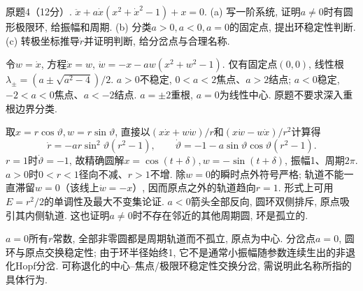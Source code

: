 \begin{exercise}
原题4（12分）. $\ddot x+a\dot x(x^2+\dot x^2-1)+x=0$. (a) 写一阶系统, 证明$a\ne0$时有圆形极限环, 给振幅和周期. (b) 分类$a>0,a<0,a=0$的固定点, 提出环稳定性判断. (c) 转极坐标推导$\dot r$并证明判断, 给分岔点与合理名称.
\end{exercise}
\begin{solution}
令$w=\dot x$, 方程$\dot x=w$, $\dot w=-x-aw(x^2+w^2-1)$. 仅有固定点$(0,0)$, 线性根$\lambda_\pm=(a\pm\sqrt{a^2-4})/2$. $a>0$不稳定, $0<a<2$焦点、$a>2$结点; $a<0$稳定, $-2<a<0$焦点、$a<-2$结点. $a=\pm2$重根, $a=0$为线性中心. 原题不要求深入重根边界分类.

取$x=r\cos\vartheta,w=r\sin\vartheta$, 直接以$(x\dot x+w\dot w)/r$和$(x\dot w-w\dot x)/r^2$计算得
\[
\dot r=-ar\sin^2\vartheta(r^2-1),\qquad
\dot\vartheta=-1-a\sin\vartheta\cos\vartheta(r^2-1).
\]
$r=1$时$\dot\vartheta=-1$, 故精确圆解$x=\cos(t+\delta),w=-\sin(t+\delta)$, 振幅1、周期$2\pi$. $a>0$时$0<r<1$径向不减、$r>1$不增. 除$w=0$的瞬时点外符号严格; 轨道不能一直滞留$w=0$（该线上$\dot w=-x$）, 因而原点之外的轨道趋向$r=1$. 形式上可用$E=r^2/2$的单调性及最大不变集论证. $a<0$箭头全部反向, 圆环双侧排斥, 原点吸引其内侧轨道. 这也证明$a\ne0$时不存在邻近的其他周期圆, 环是孤立的.

$a=0$所有$r$常数, 全部非零圆都是周期轨道而不孤立, 原点为中心. 分岔点$a=0$, 圆环与原点交换稳定性; 由于环半径始终1, 它不是通常小振幅随参数连续生出的非退化Hopf分岔. 可称退化的中心--焦点/极限环稳定性交换分岔, 需说明此名称所指的具体行为.
\end{solution}


